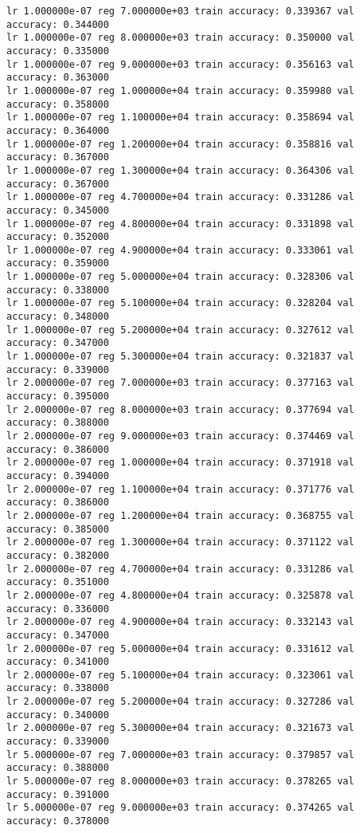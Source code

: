 \documentclass[11pt]{article}
\begin{document}
    \begin{Verbatim}[commandchars=\\\{\}]
lr 1.000000e-07 reg 7.000000e+03 train accuracy: 0.339367 val accuracy: 0.344000
lr 1.000000e-07 reg 8.000000e+03 train accuracy: 0.350000 val accuracy: 0.335000
lr 1.000000e-07 reg 9.000000e+03 train accuracy: 0.356163 val accuracy: 0.363000
lr 1.000000e-07 reg 1.000000e+04 train accuracy: 0.359980 val accuracy: 0.358000
lr 1.000000e-07 reg 1.100000e+04 train accuracy: 0.358694 val accuracy: 0.364000
lr 1.000000e-07 reg 1.200000e+04 train accuracy: 0.358816 val accuracy: 0.367000
lr 1.000000e-07 reg 1.300000e+04 train accuracy: 0.364306 val accuracy: 0.367000
lr 1.000000e-07 reg 4.700000e+04 train accuracy: 0.331286 val accuracy: 0.345000
lr 1.000000e-07 reg 4.800000e+04 train accuracy: 0.331898 val accuracy: 0.352000
lr 1.000000e-07 reg 4.900000e+04 train accuracy: 0.333061 val accuracy: 0.359000
lr 1.000000e-07 reg 5.000000e+04 train accuracy: 0.328306 val accuracy: 0.338000
lr 1.000000e-07 reg 5.100000e+04 train accuracy: 0.328204 val accuracy: 0.348000
lr 1.000000e-07 reg 5.200000e+04 train accuracy: 0.327612 val accuracy: 0.347000
lr 1.000000e-07 reg 5.300000e+04 train accuracy: 0.321837 val accuracy: 0.339000
lr 2.000000e-07 reg 7.000000e+03 train accuracy: 0.377163 val accuracy: 0.395000
lr 2.000000e-07 reg 8.000000e+03 train accuracy: 0.377694 val accuracy: 0.388000
lr 2.000000e-07 reg 9.000000e+03 train accuracy: 0.374469 val accuracy: 0.386000
lr 2.000000e-07 reg 1.000000e+04 train accuracy: 0.371918 val accuracy: 0.394000
lr 2.000000e-07 reg 1.100000e+04 train accuracy: 0.371776 val accuracy: 0.386000
lr 2.000000e-07 reg 1.200000e+04 train accuracy: 0.368755 val accuracy: 0.385000
lr 2.000000e-07 reg 1.300000e+04 train accuracy: 0.371122 val accuracy: 0.382000
lr 2.000000e-07 reg 4.700000e+04 train accuracy: 0.331286 val accuracy: 0.351000
lr 2.000000e-07 reg 4.800000e+04 train accuracy: 0.325878 val accuracy: 0.336000
lr 2.000000e-07 reg 4.900000e+04 train accuracy: 0.332143 val accuracy: 0.347000
lr 2.000000e-07 reg 5.000000e+04 train accuracy: 0.331612 val accuracy: 0.341000
lr 2.000000e-07 reg 5.100000e+04 train accuracy: 0.323061 val accuracy: 0.338000
lr 2.000000e-07 reg 5.200000e+04 train accuracy: 0.327286 val accuracy: 0.340000
lr 2.000000e-07 reg 5.300000e+04 train accuracy: 0.321673 val accuracy: 0.339000
lr 5.000000e-07 reg 7.000000e+03 train accuracy: 0.379857 val accuracy: 0.388000
lr 5.000000e-07 reg 8.000000e+03 train accuracy: 0.378265 val accuracy: 0.391000
lr 5.000000e-07 reg 9.000000e+03 train accuracy: 0.374265 val accuracy: 0.378000

\end{Verbatim}
\end{document}
